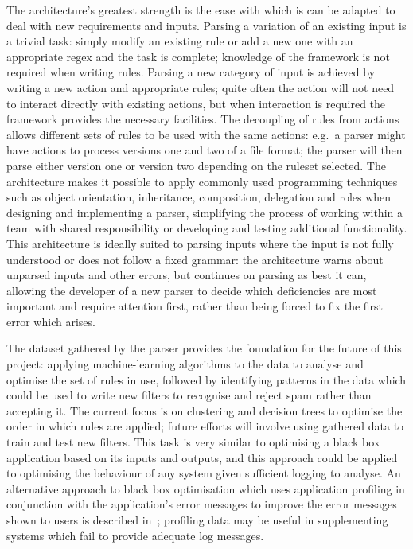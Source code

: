 \documentclass[draft]{svmult}
\begin{document}
The architecture's greatest strength is the ease with which is can be
adapted to deal with new requirements and inputs.  Parsing a variation of
an existing input is a trivial task: simply modify an existing rule or add
a new one with an appropriate regex and the task is complete; knowledge of
the framework is not required when writing rules.  Parsing a new category
of input is achieved by writing a new action and appropriate rules; quite
often the action will not need to interact directly with existing actions,
but when interaction is required the framework provides the necessary
facilities.  The decoupling of rules from actions allows different sets of
rules to be used with the same actions: e.g.\ a parser might have actions
to process versions one and two of a file format; the parser will then
parse either version one or version two depending on the ruleset selected.
The architecture makes it possible to apply commonly used programming
techniques such as object orientation, inheritance, composition, delegation
and roles when designing and implementing a parser, simplifying the process
of working within a team with shared responsibility or developing and
testing additional functionality.  This architecture is ideally suited to
parsing inputs where the input is not fully understood or does not follow a
fixed grammar: the architecture warns about unparsed inputs and other
errors, but continues on parsing as best it can, allowing the developer of
a new parser to decide which deficiencies are most important and require
attention first, rather than being forced to fix the first error which
arises.

The dataset gathered by the parser provides the foundation for the future
of this project: applying machine-learning algorithms to the data to
analyse and optimise the set of rules in use, followed by identifying
patterns in the data which could be used to write new filters to recognise
and reject spam rather than accepting it.  The current focus is on
clustering and decision trees to optimise the order in which rules are
applied; future efforts will involve using gathered data to train and test
new filters.  This task is very similar to optimising a black box
application based on its inputs and outputs, and this approach could be
applied to optimising the behaviour of any system given sufficient logging
to analyse.  An alternative approach to black box optimisation which uses
application profiling in conjunction with the application's error messages
to improve the error messages shown to users is described
in~\cite{black-box-error-reporting}; profiling data may be useful in
supplementing systems which fail to provide adequate log messages.
\end{document}

